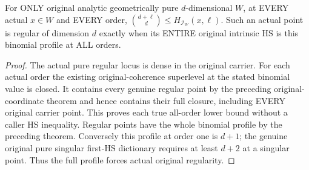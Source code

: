 \begin{theorem}
\label{hir:actual-original-pure-intrinsic-hs-minimum-and-regularity}
\leanok
For ONLY original analytic geometrically pure $d$-dimensional $W$, at
EVERY actual $x\in W$ and EVERY order, $\binom{d+\ell}{d}\le
H_{\mathcal I_W}(x,\ell)$. Such an actual point is regular of dimension
$d$ exactly when its ENTIRE original intrinsic HS is this binomial
profile at ALL orders.
\end{theorem}
\begin{proof}
The actual pure regular locus is dense in the original carrier. For
each actual order the existing original-coherence superlevel at the
stated binomial value is closed. It contains every genuine regular
point by the preceding original-coordinate theorem and hence contains
their full closure, including EVERY original carrier point. This proves
each true all-order lower bound without a caller HS inequality.
Regular points have the whole binomial profile by the preceding theorem.
Conversely this profile at order one is $d+1$; the genuine original
pure singular first-HS dictionary requires at least $d+2$ at a singular
point. Thus the full profile forces actual original regularity.
\end{proof}

